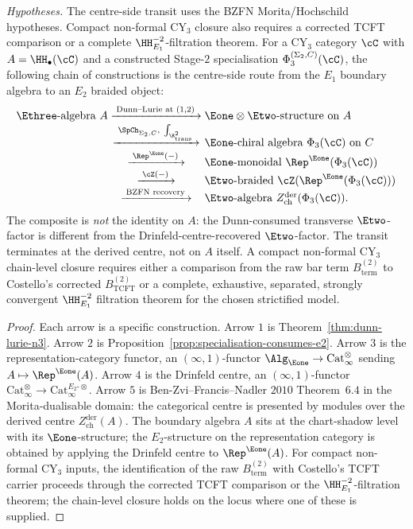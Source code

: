 \begin{proposition}[Dunn--Drinfeld transit at \texorpdfstring{$d=3$}{d=3}]
\label{prop:operadic-circle-dunn-drinfeld}
\noindent\emph{Hypotheses.} The centre-side transit uses the BZFN
Morita/Hochschild hypotheses. Compact non-formal CY$_3$ closure also
requires a corrected TCFT comparison or a complete
\(\HH^{-2}_{E_1}\)-filtration theorem.
For a CY$_3$ category $\cC$ with $A = \HH_\bullet(\cC)$ and a constructed
Stage-$2$ specialisation $\Phi_3^{(\Sigma_2,C)}(\cC)$, the following
chain of constructions is the centre-side route from the $E_1$ boundary
algebra to an $E_2$ braided object:
\[
\begin{array}{r@{\;}c@{\;}l}
 \Ethree\text{-algebra } A
 & \xrightarrow{\;\text{Dunn--Lurie at } (1, 2)\;}
 & \Eone \otimes \Etwo\text{-structure on } A \\
 & \xrightarrow{\;\SpCh_{\Sigma_2, C},\ \int_{\R^2_{\mathrm{trans}}}\;}
 & \Eone\text{-chiral algebra } \Phi_3(\cC) \text{ on } C \\
 & \xrightarrow{\;\Rep^{\Eone}(-)\;}
 & \Eone\text{-monoidal } \Rep^{\Eone}(\Phi_3(\cC)) \\
 & \xrightarrow{\;\cZ(-)\;}
 & \Etwo\text{-braided } \cZ(\Rep^{\Eone}(\Phi_3(\cC))) \\
 & \xrightarrow{\;\text{BZFN recovery}\;}
 & \Etwo\text{-algebra } Z^{\mathrm{der}}_{\mathrm{ch}}(\Phi_3(\cC)).
\end{array}
\]
The composite is \emph{not} the identity on $A$: the Dunn-consumed transverse $\Etwo$-factor is different from the Drinfeld-centre-recovered $\Etwo$-factor. The transit terminates at the derived centre, not on $A$ itself. A compact non-formal CY$_3$ chain-level closure requires either a comparison from the raw bar term $B_{\mathrm{term}}^{(2)}$ to Costello's corrected $B_{\mathrm{TCFT}}^{(2)}$ or a complete, exhaustive, separated, strongly convergent $\HH^{-2}_{E_1}$ filtration theorem for the chosen strictified model.
\end{proposition}

\begin{proof}
Each arrow is a specific construction. Arrow $1$ is Theorem~\ref{thm:dunn-lurie-n3}. Arrow $2$ is Proposition~\ref{prop:specialisation-consumes-e2}. Arrow $3$ is the representation-category functor, an $(\infty,1)$-functor $\Alg_{\Eone} \to \mathrm{Cat}_\infty^{\otimes}$ sending $A \mapsto \Rep^{\Eone}(A)$. Arrow $4$ is the Drinfeld centre, an $(\infty, 1)$-functor $\mathrm{Cat}_\infty^{\otimes} \to \mathrm{Cat}_\infty^{E_2\text{-}\otimes}$. Arrow $5$ is Ben-Zvi--Francis--Nadler $2010$ Theorem~$6.4$ in the
Morita-dualisable domain: the categorical centre is presented by
modules over the derived centre $Z^{\mathrm{der}}_{\mathrm{ch}}(A)$. The
boundary algebra $A$ sits at the chart-shadow level with its
$\Eone$-structure; the $E_2$-structure on the representation category
is obtained by applying the Drinfeld centre to \(\Rep^{\Eone}(A)\).
For compact non-formal CY$_3$ inputs, the identification of the raw
$B^{(2)}_{\mathrm{term}}$ with Costello's TCFT carrier proceeds
through the corrected TCFT comparison or the
$\HH^{-2}_{E_1}$-filtration theorem; the chain-level closure holds on
the locus where one of these is supplied.
\end{proof}

